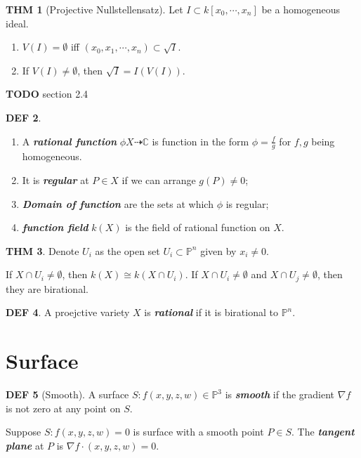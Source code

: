 \documentclass[twocolumn]{article}
\renewcommand{\emph}[1]{\textbf{\textit{#1}}}
\newcommand{\C}{\mathbb{C}}
\renewcommand{\P}{\mathbb{P}}
\theoremstyle{definition}
\newtheorem{thm}{THM}
\newtheorem{defi}[thm]{DEF}
\theoremstyle{remark}
\begin{document}
\begin{thm}[Projective Nullstellensatz]
	Let $I \subset k[x_0, \cdots, x_n]$ be a homogeneous ideal.
	\begin{enumerate}
		\item $V(I) = \emptyset$ iff $(x_0, x_1, \cdots, x_n) \subset \sqrt{I}$.
		\item  If $V(I) \neq \emptyset$, then $\sqrt{I} = I(V(I))$.
	\end{enumerate}
\end{thm}

\textbf{TODO} section 2.4 

\begin{defi}
\begin{enumerate}
	\item A \emph{rational function} $\phi X \dasharrow \C$ is function in the form $\phi = \frac{f}{g}$ for $f, g$ being homogeneous.
	\item It is \emph{regular} at $P \in X$ if we can arrange $g(P) \neq 0$;
	\item \emph{Domain of function} are the sets at which $\phi$ is regular;
	\item \emph{function field} $k(X)$ is the field of rational function on $X$.
\end{enumerate}
\end{defi}

\begin{thm}
	Denote $U_i$ as the open set $U_i \subset \P^n$ given by $x_i \neq 0$.

	If $X \cap U_i \neq \emptyset$, then $k(X) \cong k(X \cap U_i)$.
	If $X\cap U_i \neq \emptyset$ and $X \cap U_j \neq \emptyset$, then they are birational.
\end{thm}

\begin{defi}
	A proejctive variety $X$ is \emph{rational} if it is birational to $\P^n$.
\end{defi}

\section{Surface}

\begin{defi}[Smooth]
	A surface $S: f(x,y,z,w) \in \P^3$ is \emph{smooth} if the gradient $\nabla f$ is not zero at any point on $S$.
	
	Suppose $S: f(x,y,z,w) = 0$ is surface with a smooth point $P\in S$. The \emph{tangent plane} at $P$ is $\nabla f \cdot (x,y,z,w) = 0$.
\end{defi}
\end{document}
